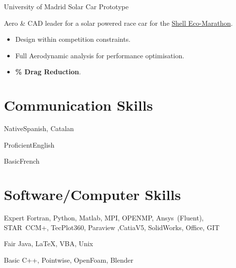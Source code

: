 \documentclass[fontsize=10pt]{tccv}
\begin{document}
\begin{eventlist}
     {University of Madrid}
     {Solar Car Prototype}

Aero \& CAD leader for a solar powered race car for the \href{http://www.shell.com/global/environment-society/ecomarathon.html}{Shell Eco-Marathon}.
\begin{itemize}
\itemsep -1pt
	\item Design within competition constraints.
        \item Full Aerodynamic analysis for performance optimisation.
	\item \textbf{\% Drag Reduction}.
\end{itemize}
\end{eventlist}

\section{Communication Skills}
\begin{factlist}
\item{Native}{Spanish, Catalan}
\item{Proficient}{English}
\item{Basic}{French}
\end{factlist}

\vspace{-20pt}
\section{Software/Computer Skills}
\begin{factlist}
\item{Expert}
     {Fortran, Python, Matlab, MPI, OPENMP, Ansys~(Fluent), STAR~CCM+, TecPlot360,
     Paraview ,CatiaV5, SolidWorks, Office, GIT}
\item{Fair}
     {Java, \LaTeX, VBA,  Unix}
\item{Basic}
     {C++, Pointwise, OpenFoam, Blender}
\end{factlist}


\vspace{-20pt}
\end{document}
